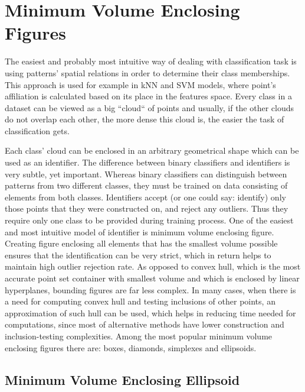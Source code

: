 \section{Minimum Volume Enclosing Figures}

The easiest and probably most intuitive way of dealing with classification task is using patterns' spatial relations in order to determine their class memberships. This approach is used for example in kNN and SVM models, where point's affiliation is calculated based on its place in the features space. Every class in a dataset can be viewed as a big ``cloud`` of points and usually, if the other clouds do not overlap each other, the more dense this cloud is, the easier the task of classification gets.

Each class' cloud can be enclosed in an arbitrary geometrical shape which can be used as an identifier. The difference between binary classifiers and identifiers is very subtle, yet important. Whereas binary classifiers can distinguish between patterns from two different classes, they must be trained on data consisting of elements from both classes. Identifiers accept (or one could say: identify) only those points that they were constructed on, and reject any outliers. Thus they require only one class to be provided during training process. One of the easiest and most intuitive model of identifier is minimum volume enclosing figure. Creating figure enclosing all elements that has the smallest volume possible ensures that the identification can be very strict, which in return helps to maintain high outlier rejection rate. As opposed to convex hull, which is the most accurate point set container with smallest volume and which is enclosed by linear hyperplanes, bounding figures are far less complex. In many cases, when there is a need for computing convex hull and testing inclusions of other points, an approximation of such hull can be used, which helps in reducing time needed for computations, since most of alternative methods have lower construction and inclusion-testing complexities. Among the most popular minimum volume enclosing figures there are: boxes, diamonds, simplexes and ellipsoids.

\subsection{Minimum Volume Enclosing Ellipsoid}


